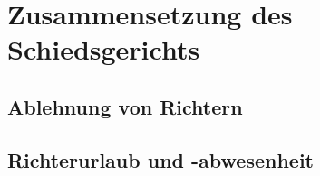 
\chapter{Zusammensetzung des Schiedsgerichts}
\blindtext[1]
\section{Ablehnung von Richtern}
\blindtext[5]
\section{Richterurlaub und -abwesenheit}
\blindtext[5]

\chapterbib
